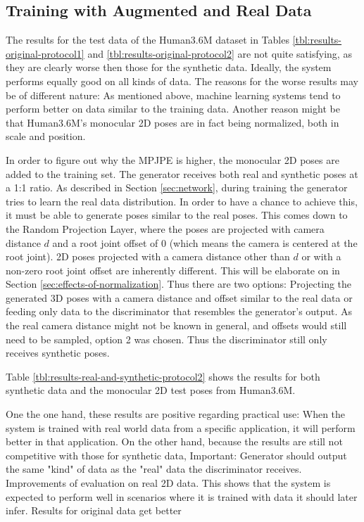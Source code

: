 


\subsection{Training with Augmented and Real Data}
The results for the test data of the Human3.6M dataset in Tables \ref{tbl:results-original-protocol1} and \ref{tbl:results-original-protocol2} are not quite satisfying, as they are clearly worse then those for the synthetic data.
Ideally, the system performs equally good on all kinds of data.
The reasons for the worse results may be of different nature:
As mentioned above, machine learning systems tend to perform better on data similar to the training data.
Another reason might be that Human3.6M's monocular 2D poses are in fact being normalized, both in scale and position.

In order to figure out why the MPJPE is higher, the monocular 2D poses are added to the training set.
The generator receives both real and synthetic poses at a 1:1 ratio.
As described in Section \ref{sec:network}, during training the generator tries to learn the real data distribution.
In order to have a chance to achieve this, it must be able to generate poses similar to the real poses. 
This comes down to the Random Projection Layer, where the poses are projected with camera distance $d$ and a root joint offset of $0$ (which means the camera is centered at the root joint).
2D poses projected with a camera distance other than $d$ or with a non-zero root joint offset are inherently different.
This will be elaborate on in Section \ref{sec:effects-of-normalization}.
Thus there are two options:
Projecting the generated 3D poses with a camera distance and offset similar to the real data or feeding only data to the discriminator that resembles the generator's output.
As the real camera distance might not be known in general, and offsets would still need to be sampled, option 2 was chosen.
Thus the discriminator still only receives synthetic poses.



Table \ref{tbl:results-real-and-synthetic-protocol2} shows the results for both synthetic data and the monocular 2D test poses from Human3.6M.

One the one hand, these results are positive regarding practical use:
When the system is trained with real world data from a specific application, it will perform better in that application.
On the other hand, because the results are still not competitive with those for synthetic data, 
Important: Generator should output the same "kind" of data as the "real" data the discriminator receives.
Improvements of evaluation on real 2D data. 
This shows that the system is expected to perform well in scenarios where it is trained with data it should later infer.
Results for original data get better

